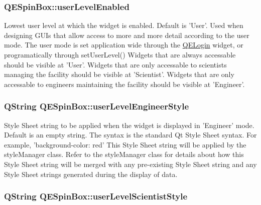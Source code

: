 \hypertarget{classQESpinBox_ab767d9e77fd21f19ad60ffc107f57253}{
\subsubsection[{userLevelEnabled}]{ QESpinBox::userLevelEnabled}}
\label{classQESpinBox_ab767d9e77fd21f19ad60ffc107f57253}
Lowest user level at which the widget is enabled. Default is 'User'. Used when designing GUIs that allow access to more and more detail according to the user mode. The user mode is set application wide through the \hyperlink{classQELogin}{QELogin} widget, or programatically through setUserLevel() Widgets that are always accessable should be visible at 'User'. Widgets that are only accessable to scientists managing the facility should be visible at 'Scientist'. Widgets that are only accessable to engineers maintaining the facility should be visible at 'Engineer'. \hypertarget{classQESpinBox_ae0832126a5745409e97eebbc96933956}{
\subsubsection[{userLevelEngineerStyle}]{\setlength{\rightskip}{0pt plus 5cm}QString QESpinBox::userLevelEngineerStyle}}
\label{classQESpinBox_ae0832126a5745409e97eebbc96933956}
Style Sheet string to be applied when the widget is displayed in 'Engineer' mode. Default is an empty string. The syntax is the standard Qt Style Sheet syntax. For example, 'background-\/color: red' This Style Sheet string will be applied by the styleManager class. Refer to the styleManager class for details about how this Style Sheet string will be merged with any pre-\/existing Style Sheet string and any Style Sheet strings generated during the display of data. \hypertarget{classQESpinBox_a321df6a5a5d9eab84b1ce3fbe3bc0b9e}{
\subsubsection[{userLevelScientistStyle}]{\setlength{\rightskip}{0pt plus 5cm}QString QESpinBox::userLevelScientistStyle}}
